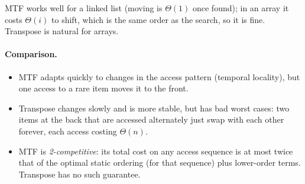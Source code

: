 MTF works well for a linked list (moving is $\Theta(1)$ once found); in an array
it costs $\Theta(i)$ to shift, which is the same order as the search, so it is
fine. Transpose is natural for arrays.

\paragraph{Comparison.}
\begin{itemize}
  \item MTF adapts quickly to changes in the access pattern (temporal locality),
        but one access to a rare item moves it to the front.
  \item Transpose changes slowly and is more stable, but has bad worst cases: two
        items at the back that are accessed alternately just swap with each
        other forever, each access costing $\Theta(n)$.
  \item MTF is \emph{2-competitive}: its total cost on any access sequence is at
        most twice that of the optimal static ordering (for that sequence) plus
        lower-order terms. Transpose has no such guarantee.
\end{itemize}

